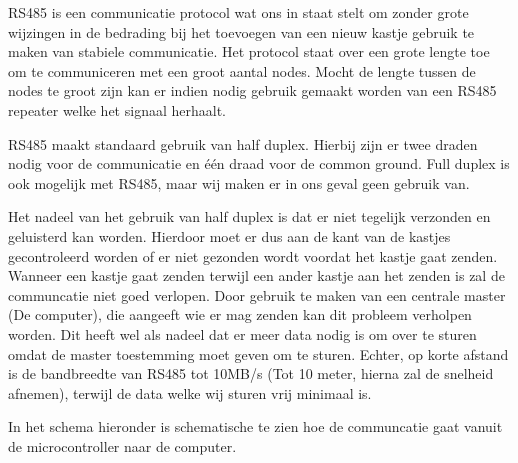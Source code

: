RS485 is een communicatie protocol wat ons in staat stelt om zonder grote wijzingen in de bedrading bij het toevoegen van een nieuw kastje gebruik te maken van stabiele communicatie. Het protocol staat over een grote lengte toe om te communiceren met een groot aantal nodes. Mocht de lengte tussen de nodes te groot zijn kan er indien nodig gebruik gemaakt worden van een RS485 repeater welke het signaal herhaalt.

RS485 maakt standaard gebruik van half duplex. Hierbij zijn er twee draden nodig voor de communicatie en \'{e}\'{e}n draad voor de common ground. Full duplex is ook mogelijk met RS485, maar wij maken er in ons geval geen gebruik van.

Het nadeel van het gebruik van half duplex is dat er niet tegelijk verzonden en geluisterd kan worden. Hierdoor moet er dus aan de kant van de kastjes gecontroleerd worden of er niet gezonden wordt voordat het kastje gaat zenden. Wanneer een kastje gaat zenden terwijl een ander kastje aan het zenden is zal de communcatie niet goed verlopen. Door gebruik te maken van een centrale master (De computer), die aangeeft wie er mag zenden kan dit probleem verholpen worden. Dit heeft wel als nadeel dat er meer data nodig is om over te sturen omdat de master toestemming moet geven om te sturen. Echter, op korte afstand is de bandbreedte van RS485 tot 10MB/s (Tot 10 meter, hierna zal de snelheid afnemen), terwijl de data welke wij sturen vrij minimaal is.

In het schema hieronder is schematische te zien hoe de communcatie gaat vanuit de microcontroller naar de computer.

\begin{center}
\end{center}
